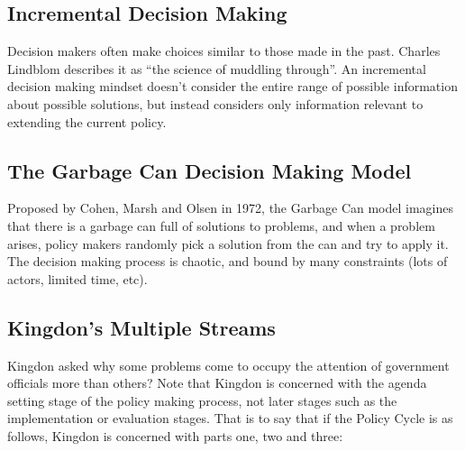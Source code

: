 

\subsection{Incremental Decision Making}


Decision makers often make choices similar to those made in the
past. Charles Lindblom describes it as ``the science of muddling
through''. An incremental decision making mindset doesn't consider the
entire range of possible information about possible solutions, but
instead considers only information relevant to extending the current
policy.

\subsection{The Garbage Can Decision Making Model}


Proposed by Cohen, Marsh and Olsen in 1972, the Garbage Can model
imagines that there is a garbage can full of solutions to problems,
and when a problem arises, policy makers randomly pick a solution from
the can and try to apply it. The decision making process is chaotic,
and bound by many constraints (lots of actors, limited time, etc).

\subsection{Kingdon's Multiple Streams}


Kingdon asked why some problems come to occupy the attention of
government officials more than others? Note that Kingdon is concerned
with the agenda setting stage of the policy making process, not later
stages such as the implementation or evaluation stages. That is to say
that if the Policy Cycle is as follows, Kingdon is concerned with
parts one, two and three:

